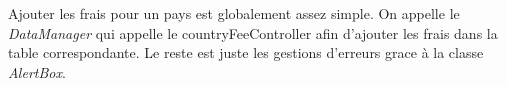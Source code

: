 Ajouter les frais pour un pays est globalement assez simple. On appelle le \emph{DataManager} qui appelle le countryFeeController 
afin d'ajouter les frais dans la table correspondante. Le reste est juste les gestions d'erreurs grace à la classe \emph{AlertBox}.